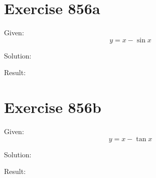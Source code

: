 \documentclass[a4paper, 10pt]{scrartcl}
\begin{document}
\section{Exercise 856a}

Given:
\[
y = x - \sin{x}
\]

Solution:

Result:

\section{Exercise 856b}

Given:
\[
y = x - \tan{x}
\]

Solution:

Result:
\end{document}
